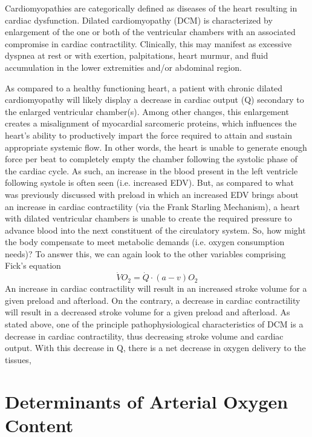 {\begin{itemize}
Cardiomyopathies are categorically defined as diseases of the heart resulting in cardiac dysfunction. Dilated cardiomyopathy (DCM) is characterized by enlargement of the one or both of the ventricular chambers with an associated compromise in cardiac contractility. Clinically, this may manifest as excessive dyspnea at rest or with exertion, palpitations, heart murmur, and fluid accumulation in the lower extremities and/or abdominal region. 


As compared to a healthy functioning heart, a patient with chronic dilated cardiomyopathy will likely display a decrease in cardiac output (Q) secondary to the enlarged ventricular chamber(s). Among other changes, this enlargement creates a misalignment of myocardial sarcomeric proteins, which influences the heart's ability to productively impart the force required to attain and sustain appropriate systemic flow. In other words, the heart is unable to generate enough force per beat to completely empty the chamber following the systolic phase of the cardiac cycle. As such, an increase in the blood present in the left ventricle following systole is often seen (i.e. increased EDV). But, as compared to what was previously discussed with preload in which an increased EDV brings about an increase in cardiac contractility (via the Frank Starling Mechanism), a heart with dilated ventricular chambers is unable to create the required pressure to advance blood into the next constituent of the circulatory system. So, how might the body compensate to meet metabolic demands (i.e. oxygen consumption needs)? To answer this, we can again look to the other variables comprising Fick's equation \begin{equation}
    \dot{V}O_2 = \dot{Q} \cdot (a-v)O_2
\end{equation}
An increase in cardiac contractility will result in an increased stroke volume for a given preload and afterload. On the contrary, a decrease in cardiac contractility will result in a decreased stroke volume for a given preload and afterload. As stated above, one of the principle pathophysiological characteristics of DCM is a decrease in cardiac contractility, thus decreasing stroke volume and cardiac output. With this decrease in Q, there is a net decrease in oxygen delivery to the tissues, 


\section{Determinants of Arterial Oxygen Content}


\end{itemize}}
